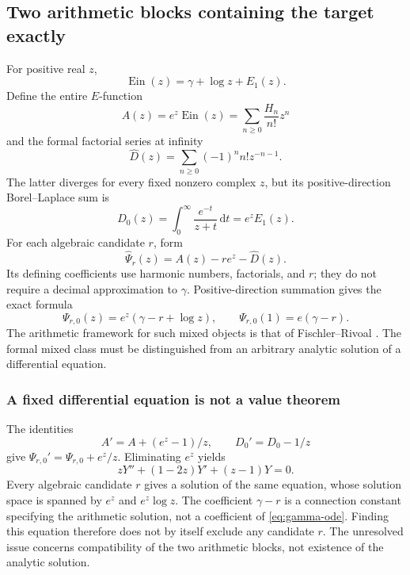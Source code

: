 \documentclass[11pt,a4paper]{article}
\numberwithin{equation}{section}
\theoremstyle{definition}
\theoremstyle{remark}
\newcommand{\Ein}{\operatorname{Ein}}
\newcommand{\dd}{\,\mathrm d}
\begin{document}
\subsection{Two arithmetic blocks containing the target exactly}
For positive real $z$,
\begin{equation}
 \Ein(z)=\gamma+\log z+E_1(z).
\end{equation}
Define the entire $E$-function
\begin{equation}\label{eq:gamma-A}
 A(z)=e^z\Ein(z)=\sum_{n\ge0}\frac{H_n}{n!}z^n
\end{equation}
and the formal factorial series at infinity
\begin{equation}\label{eq:gamma-D}
 \widehat D(z)=\sum_{n\ge0}(-1)^n n!z^{-n-1}.
\end{equation}
The latter diverges for every fixed nonzero complex $z$, but its
positive-direction Borel--Laplace sum is
\begin{equation}\label{eq:Borel-D}
 D_0(z)=\int_0^\infty\frac{e^{-t}}{z+t}\dd t=e^zE_1(z).
\end{equation}
For each algebraic candidate $r$, form
\begin{equation}
 \widehat\Psi_r(z)=A(z)-r e^z-\widehat D(z).
\end{equation}
Its defining coefficients use harmonic numbers, factorials, and $r$;
they do not require a decimal approximation to $\gamma$.
Positive-direction summation gives the exact formula
\begin{equation}\label{eq:gamma-target}
 \Psi_{r,0}(z)=e^z(\gamma-r+\log z),\qquad
 \Psi_{r,0}(1)=e(\gamma-r).
\end{equation}
The arithmetic framework for such mixed objects is that of
Fischler--Rivoal \cite{FischlerRivoalGevrey}. The formal mixed class
must be distinguished from an arbitrary analytic solution of a
differential equation.

\subsubsection{A fixed differential equation is not a value theorem}
The identities
\[
 A'=A+(e^z-1)/z,\qquad D_0'=D_0-1/z
\]
give $\Psi_{r,0}'=\Psi_{r,0}+e^z/z$. Eliminating $e^z$ yields
\begin{equation}\label{eq:gamma-ode}
 zY''+(1-2z)Y'+(z-1)Y=0.
\end{equation}
Every algebraic candidate $r$ gives a solution of the same equation,
whose solution space is spanned by $e^z$ and $e^z\log z$.
The coefficient $\gamma-r$ is a connection constant specifying the
arithmetic solution, not a coefficient of \eqref{eq:gamma-ode}.
Finding this equation therefore does not by itself exclude any candidate
$r$. The unresolved issue concerns compatibility of the two arithmetic
blocks, not existence of the analytic solution.
\end{document}
